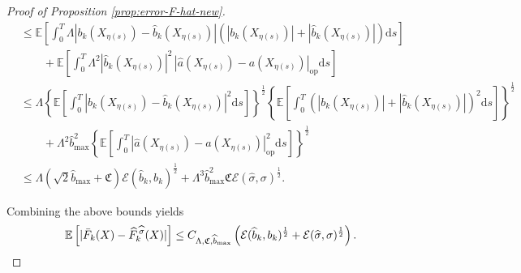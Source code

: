 \documentclass{article}
\theoremstyle{plain}
\theoremstyle{definition}
\theoremstyle{remark}
\renewcommand{\d}{\mathrm{d}}
\newcommand{\EE}{\mathbb{E}}
\newcommand{\calE}{\mathcal{E}}
\begin{document}
\begin{proof}[Proof of Proposition \ref{prop:error-F-hat-new}]
\begin{align}
    &\leq \EE \left[\int_0^T \Lambda \left|b_k(X_{\eta(s)})-\widehat b_k(X_{\eta(s)})\right|\left(\left|b_k(X_{\eta(s)})\right|+\left|\widehat b_k(X_{\eta(s)})\right|\right)\d s\right]\nonumber\\
    &\qquad +\EE \left[\int_0^T \Lambda^2 \left|\widehat{b}_k(X_{\eta(s)})\right|^2\,\left|\widehat a(X_{\eta(s)})-a(X_{\eta(s)})\right|_{\mathrm{op}}\d s\right]\nonumber\\
    &\leq \Lambda \!\left\{\!\EE \left[\int_0^T \!\!\left|b_k(X_{\eta(s)})-\widehat b_k(X_{\eta(s)})\right|^2 \!\d s\right]\!\right\}^{\frac{1}{2}}\!\!\left\{\EE\left[\int_0^T \!\!\left(\left|b_k(X_{\eta(s)})\right|+\left|\widehat b_k(X_{\eta(s)})\right|\right)^2\!\d s\right]\!\right\}^{\frac{1}{2}}\nonumber\\
    &\qquad+\Lambda^2 \widehat{b}_{\max}^2\left\{\EE \left[\int_0^T \left|\widehat a(X_{\eta(s)})-a(X_{\eta(s)})\right|_{\mathrm{op}}^2\d s\right]\right\}^{\frac{1}{2}}\nonumber\\
    &\leq \Lambda (\sqrt{2}\widehat{b}_{\max}+\mathfrak{C})\calE(\widehat b_k, b_k)^{\frac{1}{2}}+\Lambda^{3} \widehat{b}_{\max}^2\mathfrak{C}\mathcal{E}(\widehat\sigma,\sigma)^{\frac{1}{2}}.
\end{align}

Combining the above bounds yields
   \[\EE \left[ |\bar F_k(X)-\widehat F^{\,\widehat{\sigma}}_k(X)|\right]\leq C_{\Lambda, \mathfrak{C}, \widehat b_{\max}}\left(\calE(\widehat b_k, b_k)^{\frac{1}{2}}+\mathcal{E}(\widehat\sigma,\sigma)^{\frac{1}{2}}\right). \hfill\qedhere\]
\end{proof}
\end{document}
